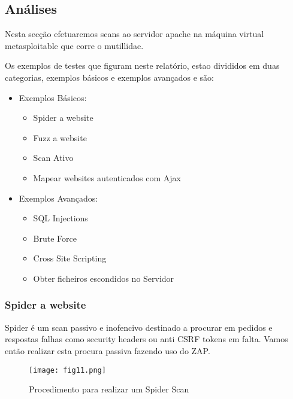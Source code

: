 
\subsection{Análises}

Nesta secção efetuaremos scans ao servidor apache na máquina virtual metasploitable que corre o mutillidae.\newline

\par Os exemplos de testes que figuram neste relatório, estao divididos em duas categorias, exemplos básicos e exemplos avançados e são:
\begin{itemize}
  \item Exemplos Básicos:
  \begin{itemize}
    \item Spider a website
    \item Fuzz a website
    \item Scan Ativo
    \item Mapear websites autenticados com Ajax
  \end{itemize}

  \item Exemplos Avançados:
  \begin{itemize}
    \item SQL Injections
    \item Brute Force
    \item Cross Site Scripting
    \item Obter ficheiros escondidos no Servidor
  \end{itemize}
\end{itemize}













\subsubsection{Spider a website}

Spider é um scan passivo e inofencivo destinado a procurar em pedidos e respostas falhas como security headers ou anti CSRF tokens em falta. 
Vamos então realizar esta procura passiva fazendo uso do ZAP.
\begin{figure}[H]

  \centering

  \texttt{[image: fig11.png]}

  \caption{Procedimento para realizar um Spider Scan}

\end{figure}

